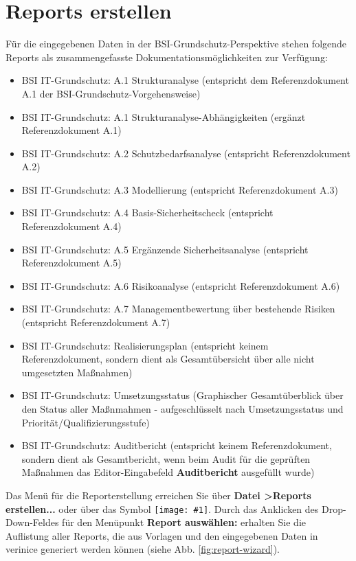 \documentclass[a4paper,10pt]{book}
\newcommand{\icon}[1]{\texttt{[image: \#1]}}
\begin{document}
\section{Reports erstellen}
\label{Reports erstellen}
Für die eingegebenen Daten in der BSI-Grundschutz-Perspektive stehen folgende Reports als zusammengefasste Dokumentationsmöglichkeiten zur Verfügung:
\begin{itemize}
 \item BSI IT-Grundschutz: A.1 Strukturanalyse (entspricht dem Referenzdokument A.1 der BSI-Grundschutz-Vorgehensweise)
 \item BSI IT-Grundschutz: A.1 Strukturanalyse-Abhängigkeiten (ergänzt Referenzdokument A.1)
 \item BSI IT-Grundschutz: A.2 Schutzbedarfsanalyse (entspricht Referenzdokument A.2)
 \item BSI IT-Grundschutz: A.3 Modellierung (entspricht Referenzdokument A.3)
 \item BSI IT-Grundschutz: A.4 Basis-Sicherheitscheck (entspricht Referenzdokument A.4)
 \item BSI IT-Grundschutz: A.5 Ergänzende Sicherheitsanalyse (entspricht Referenzdokument A.5)
 \item BSI IT-Grundschutz: A.6 Risikoanalyse (entspricht Referenzdokument A.6)
 \item BSI IT-Grundschutz: A.7 Managementbewertung über bestehende Risiken (entspricht Referenzdokument A.7)
 \item BSI IT-Grundschutz: Realisierungsplan (entspricht keinem Referenzdokument, sondern dient als Gesamtübersicht über alle nicht umgesetzten Maßnahmen)
 \item BSI IT-Grundschutz: Umsetzungsstatus (Graphischer Gesamtüberblick über den Status aller Maßnmahmen - aufgeschlüsselt nach Umsetzungsstatus und Priorität/Qualifizierungsstufe)
 \item BSI IT-Grundschutz: Auditbericht (entspricht keinem Referenzdokument, sondern dient als Gesamtbericht, wenn beim Audit für die geprüften Maßnahmen das Editor-Eingabefeld \textbf{Auditbericht} ausgefüllt wurde)
\end{itemize}

Das Menü für die Reporterstellung erreichen Sie über \textbf{Datei
  \textgreater Reports erstellen...} oder über das Symbol
\icon{Icon/Report.png}. Durch das Anklicken des
Drop-Down-Feldes für den Menüpunkt \textbf{Report auswählen:} erhalten
Sie die Auflistung aller Reports, die aus Vorlagen und den
eingegebenen Daten in verinice generiert werden können (siehe
Abb. \ref{fig:report-wizard}).
\end{document}
